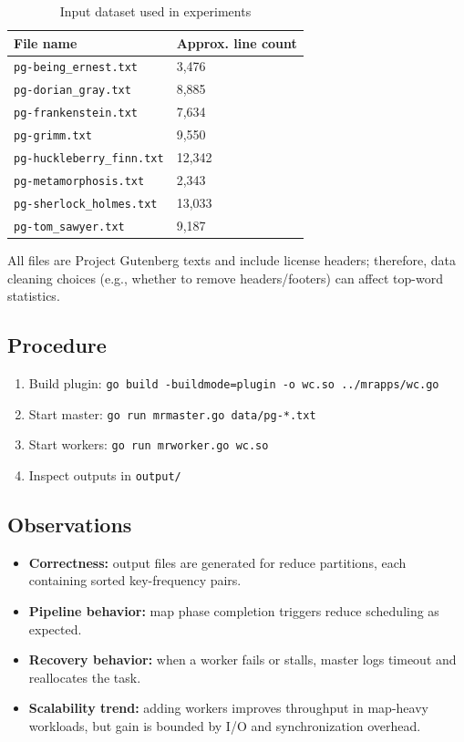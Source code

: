 \documentclass[12pt]{article}
\begin{document}
\begin{table}[H]
\centering
\caption{Input dataset used in experiments}
\label{tab:dataset}
\begin{tabular}{ll}
\toprule
File name & Approx. line count \\
\midrule
\texttt{pg-being\_ernest.txt} & 3,476 \\
\texttt{pg-dorian\_gray.txt} & 8,885 \\
\texttt{pg-frankenstein.txt} & 7,634 \\
\texttt{pg-grimm.txt} & 9,550 \\
\texttt{pg-huckleberry\_finn.txt} & 12,342 \\
\texttt{pg-metamorphosis.txt} & 2,343 \\
\texttt{pg-sherlock\_holmes.txt} & 13,033 \\
\texttt{pg-tom\_sawyer.txt} & 9,187 \\
\bottomrule
\end{tabular}
\end{table}

All files are Project Gutenberg texts and include license headers; therefore, data cleaning choices (e.g., whether to remove headers/footers) can affect top-word statistics.

\subsection{Procedure}
\begin{enumerate}[leftmargin=1.5em]
  \item Build plugin: \texttt{go build -buildmode=plugin -o wc.so ../mrapps/wc.go}
  \item Start master: \texttt{go run mrmaster.go data/pg-*.txt}
  \item Start workers: \texttt{go run mrworker.go wc.so}
  \item Inspect outputs in \texttt{output/}
\end{enumerate}

\subsection{Observations}
\begin{itemize}[leftmargin=1.5em]
  \item \textbf{Correctness:} output files are generated for reduce partitions, each containing sorted key-frequency pairs.
  \item \textbf{Pipeline behavior:} map phase completion triggers reduce scheduling as expected.
  \item \textbf{Recovery behavior:} when a worker fails or stalls, master logs timeout and reallocates the task.
  \item \textbf{Scalability trend:} adding workers improves throughput in map-heavy workloads, but gain is bounded by I/O and synchronization overhead.
\end{itemize}
\end{document}
